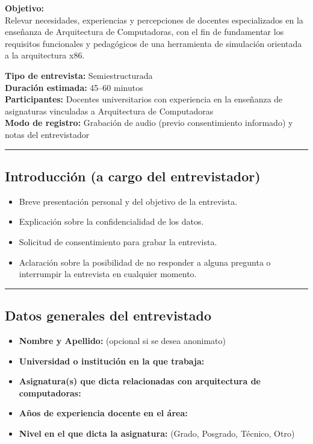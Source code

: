 \documentclass[12pt,oneside]{templates/unerthesis}
\providecommand{\tightlist}{%
  \setlength{\itemsep}{0pt}\setlength{\parskip}{0pt}}
\begin{document}
\textbf{Objetivo:}\\
Relevar necesidades, experiencias y percepciones de docentes especializados en la enseñanza de Arquitectura de Computadoras, con el fin de fundamentar los requisitos funcionales y pedagógicos de una herramienta de simulación orientada a la arquitectura x86.

\textbf{Tipo de entrevista:} Semiestructurada\\
\textbf{Duración estimada:} 45--60 minutos\\
\textbf{Participantes:} Docentes universitarios con experiencia en la enseñanza de asignaturas vinculadas a Arquitectura de Computadoras\\
\textbf{Modo de registro:} Grabación de audio (previo consentimiento informado) y notas del entrevistador

\begin{center}\rule{0.5\linewidth}{0.5pt}\end{center}

\hypertarget{introducciuxf3n-a-cargo-del-entrevistador}{%
\subsection{Introducción (a cargo del entrevistador)}\label{introducciuxf3n-a-cargo-del-entrevistador}}

\begin{itemize}
\tightlist
\item
  Breve presentación personal y del objetivo de la entrevista.
\item
  Explicación sobre la confidencialidad de los datos.
\item
  Solicitud de consentimiento para grabar la entrevista.
\item
  Aclaración sobre la posibilidad de no responder a alguna pregunta o interrumpir la entrevista en cualquier momento.
\end{itemize}

\begin{center}\rule{0.5\linewidth}{0.5pt}\end{center}

\hypertarget{datos-generales-del-entrevistado}{%
\subsection{Datos generales del entrevistado}\label{datos-generales-del-entrevistado}}

\begin{itemize}
\tightlist
\item
  \textbf{Nombre y Apellido:} (opcional si se desea anonimato)
\item
  \textbf{Universidad o institución en la que trabaja:}
\item
  \textbf{Asignatura(s) que dicta relacionadas con arquitectura de computadoras:}
\item
  \textbf{Años de experiencia docente en el área:}
\item
  \textbf{Nivel en el que dicta la asignatura:} (Grado, Posgrado, Técnico, Otro)
\end{itemize}
\end{document}
